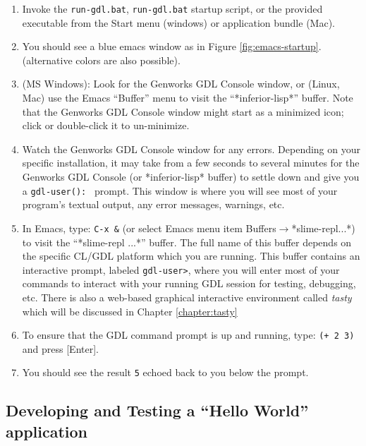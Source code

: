 \documentclass [11pt]{book}
\begin{document}
\begin{enumerate}

\item Invoke the \texttt{run-gdl.bat}, \texttt{run-gdl.bat}
startup script, or the provided executable from the Start
menu (windows) or application bundle (Mac).

\item You should see a blue emacs window as in Figure 
\ref{fig:emacs-startup}. (alternative colors are also possible).

\item (MS Windows): Look for the Genworks GDL Console
window, or (Linux, Mac) use the Emacs ``Buffer'' menu to visit the
``*inferior-lisp*'' buffer. Note that the Genworks GDL Console
window might start as a minimized icon; click or double-click it to
un-minimize.

\item Watch the Genworks GDL Console window for any
errors. Depending on your specific installation, it may take from a
few seconds to several minutes for the Genworks GDL Console (or
*inferior-lisp* buffer) to settle down and give you a \texttt{gdl-user(): } prompt. This window is where you will see most of your program's textual output, any 
error messages, warnings, etc.

\item In Emacs, type: \texttt{C-x \&} (or select Emacs menu item Buffers$\rightarrow$*slime-repl...*) to visit the ``*slime-repl ...*'' buffer. The full name
of this buffer depends on the specific CL/GDL platform which you are
running. This buffer contains an interactive prompt, labeled \texttt{gdl-user>}, where you will enter most of your commands to interact with your running GDL session
for testing, debugging, etc. There is also a web-based graphical interactive environment called \emph{tasty} which will be discussed in Chapter 
\ref{chapter:tasty}

\item To ensure that the GDL command prompt is up and running, type: \texttt{(+ 2 3)} and press [Enter].

\item You should see the result \texttt{5} echoed back to you below the prompt.

\end{enumerate}



\subsection{Developing and Testing a  ``Hello World'' application}
\end{document}
